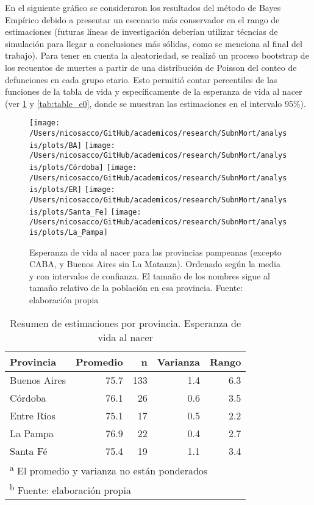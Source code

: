 \documentclass[12pt,]{article}
\begin{document}
En el siguiente gráfico se consideraron los resultados del método de
Bayes Empírico debido a presentar un escenario más conservador en el
rango de estimaciones (futuras líneas de investigación deberían utilizar
técncias de simulación para llegar a conclusiones más sólidas, como se
menciona al final del trabajo). Para tener en cuenta la aleatoriedad, se
realizó un proceso bootstrap de los recuentos de muertes a partir de una
distribución de Poisson del conteo de defunciones en cada grupo etario.
Esto permitió contar percentiles de las funciones de la tabla de vida y
específicamente de la esperanza de vida al nacer (ver \ref{fig:jerarq} y
\ref{tab:table_e0}, donde se muestran las estimaciones en el intervalo
95\%).

\begin{figure}

{\centering \texttt{[image: /Users/nicosacco/GitHub/academicos/research/SubnMort/analysis/plots/BA]} \texttt{[image: /Users/nicosacco/GitHub/academicos/research/SubnMort/analysis/plots/Córdoba]} \texttt{[image: /Users/nicosacco/GitHub/academicos/research/SubnMort/analysis/plots/ER]} \texttt{[image: /Users/nicosacco/GitHub/academicos/research/SubnMort/analysis/plots/Santa\_Fe]} \texttt{[image: /Users/nicosacco/GitHub/academicos/research/SubnMort/analysis/plots/La\_Pampa]} 

}

\caption{Esperanza de vida al nacer para las provincias pampeanas (excepto CABA, y Buenos Aires sin La Matanza). Ordenado según la media y con intervalos de confianza. El tamaño de los nombres sigue al tamaño relativo de la población en esa provincia. Fuente: elaboración propia}\label{fig:jerarq}
\end{figure}

\begin{table}

\caption{\label{tab:dispersion}Resumen de estimaciones por provincia. Esperanza de vida al nacer}
\centering
\begin{tabular}[t]{l|r|r|r|r}
\hline
Provincia & Promedio & n & Varianza & Rango\\
\hline
Buenos Aires & 75.7 & 133 & 1.4 & 6.3\\
\hline
Córdoba & 76.1 & 26 & 0.6 & 3.5\\
\hline
Entre Ríos & 75.1 & 17 & 0.5 & 2.2\\
\hline
La Pampa & 76.9 & 22 & 0.4 & 2.7\\
\hline
Santa Fé & 75.4 & 19 & 1.1 & 3.4\\
\hline
\multicolumn{5}{l}{\textsuperscript{a} El promedio y varianza no están ponderados}\\
\multicolumn{5}{l}{\textsuperscript{b} Fuente: elaboración propia}\\
\end{tabular}
\end{table}
\end{document}
